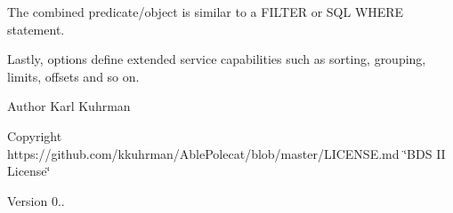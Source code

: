 The combined predicate/object is similar to a F\+I\+L\+T\+E\+R or S\+Q\+L W\+H\+E\+R\+E statement.

Lastly, options define extended service capabilities such as sorting, grouping, limits, offsets and so on.

\begin{DoxyAuthor}{Author}
Karl Kuhrman 
\end{DoxyAuthor}
\begin{DoxyCopyright}{Copyright}
https\+://github.com/kkuhrman/\+Able\+Polecat/blob/master/\+L\+I\+C\+E\+N\+S\+E.\+md \char`\"{}\+B\+D\+S I\+I License\char`\"{} 
\end{DoxyCopyright}
\begin{DoxyVersion}{Version}
0.. 
\end{DoxyVersion}
